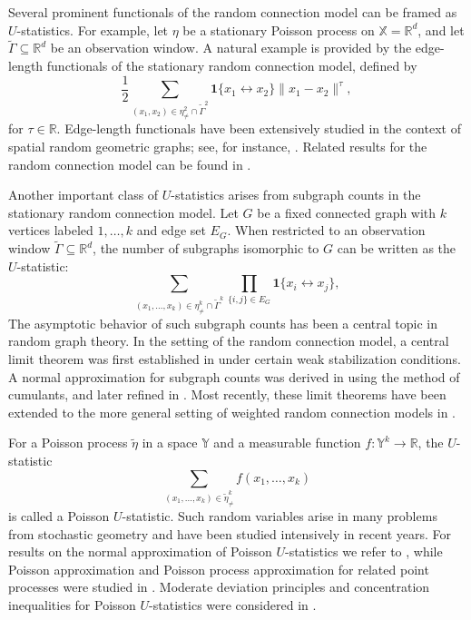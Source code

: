 \documentclass{article}
\theoremstyle{definition}
\numberwithin{equation}{section}
\theoremstyle{remark}
\begin{document}
Several prominent functionals of the random connection model can be framed as $U$-statistics. For example, let $\eta$ be a stationary Poisson process on $\mathbb{X}=\mathbb{R}^d$, and let $\widetilde{\Gamma}\subseteq\mathbb{R}^d$ be an observation window. A natural example is provided by the edge-length functionals of the stationary random connection model, defined by 
$$
\frac{1}{2}\sum_{(x_1,x_2)\in\eta^2_{\neq}\cap \widetilde{\Gamma}^2} \mathbf{1}\{x_1\leftrightarrow x_2\} \|x_1-x_2\|^\tau,
$$
for $\tau\in\mathbb{R}$. 
Edge-length functionals have been extensively studied in the context of spatial random geometric graphs; see, for instance, \cite{reitznerschultethaele,hirsch2024upper,rs3,scs,trauthwein2025quantitative,rs4}. Related results for the random connection model can be found in \cite{iyer,Heerten_Hirsch_Otto}.

Another important class of $U$-statistics arises from subgraph counts in the stationary random connection model. Let $G$ be a fixed connected graph with $k$ vertices labeled $1,\ldots,k$ and edge set $E_G$. When restricted to an observation window $\widetilde{\Gamma}\subseteq\mathbb{R}^d$, the number of subgraphs isomorphic to $G$ can be written as the $U$-statistic:
$$
\sum_{(x_1,\ldots,x_k)\in\eta^{k}_{\neq}\cap \widetilde{\Gamma}^k} \prod_{\{i,j\}\in E_G} \mathbf{1}\{x_i\leftrightarrow x_j\},
$$
The asymptotic behavior of such subgraph counts has been a central topic in random graph theory. In the setting of the random connection model, a central limit theorem was first established in \cite{can2022} under certain weak stabilization conditions. A normal approximation for subgraph counts was derived in \cite{LiuPrivault} using the method of cumulants, and later refined in \cite{LiuPrivault25b}. Most recently, these limit theorems have been extended to the more general setting of weighted random connection models in \cite{Heerten_Hirsch_Otto}.

For a Poisson process $\tilde{\eta}$ in a space $\mathbb{Y}$ and a measurable function $f:\mathbb{Y}^k\to\mathbb{R}$, the $U$-statistic
$$
\sum_{(x_1,\ldots,x_k)\in\tilde{\eta}^k_{\neq}} f(x_1,\ldots,x_k)
$$
is called a Poisson $U$-statistic. Such random variables arise in many problems from stochastic geometry and have been studied intensively in recent years. For results on the normal approximation of Poisson $U$-statistics we refer to \cite{reitznerschulte,eichelsbacher,schulte}, while Poisson approximation and Poisson process approximation for related point processes were studied in \cite{dst, pianoforte}. Moderate deviation principles and concentration inequalities for Poisson $U$-statistics were considered in \cite{Bonnet_Gusakova,schulte2}.
\end{document}
